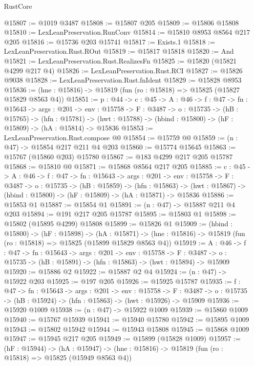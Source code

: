 \begin{lexlean}{RustCore}
\begin{coremodule}
@15807 := @1019 @3487
@15808 := @15807 @205
@15809 := @15806 @15808
@15810 := LexLeanPreservation.RunConv
@15814 := @15810 @8953 @8564 @217 @205
@15816 := @15736 @203 @15741
@15817 := Exists.{1}
@15818 := LexLeanPreservation.Rust.ROut
@15819 := @15817 @15818
@15820 := And
@15821 := LexLeanPreservation.Rust.RealizesFn
@15825 := @15820 (@15821 @4299 @217 @4)
@15826 := LexLeanPreservation.Rust.RCI
@15827 := @15826 @9038
@15828 := LexLeanPreservation.Rust.fnIdent
@15829 := @15828 @8953
@15836 := (hne : @15816) -> @15819 (fun (ro : @15818) => @15825 (@15827 @15829 @8563 @4))
@15851 := {p : @44} ->
  {c : @45} ->
  {A : @46} ->
  {f : @47} ->
  {fn : @15643} ->
  {args : @201} ->
  {env : @15758} ->
  {F : @3487} ->
  {o : @15735} ->
  (hB : @15765) ->
  (hfn : @15781) -> (hwt : @15788) -> (hbind : @15800) -> (hF : @15809) -> (hA : @15814) -> @15836
@15853 := LexLeanPreservation.Rust.compose @0
@15854 := @15759 @0
@15859 := (n : @47) -> @15854 @217 @211 @4 @203
@15860 := @15774 @15645
@15863 := @15767 (@15860 @203) @15780
@15867 := @183 @4299 @217 @205 @15787
@15868 := @15810 @0
@15871 := @15868 @8564 @217 @205
@15885 := {c : @45} ->
  {A : @46} ->
  {f : @47} ->
  {fn : @15643} ->
  {args : @201} ->
  {env : @15758} ->
  {F : @3487} ->
  {o : @15735} ->
  (hB : @15859) ->
  (hfn : @15863) -> (hwt : @15867) -> (hbind : @15800) -> (hF : @15809) -> (hA : @15871) -> @15836
@15886 := @15853 @1
@15887 := @15854 @1
@15891 := (n : @47) -> @15887 @211 @4 @203
@15894 := @191 @217 @205 @15787
@15895 := @15803 @1
@15898 := @15802 (@15895 @4299) @15808
@15899 := @15826 @1
@15909 := (hbind : @15800) ->
  (hF : @15898) ->
  (hA : @15871) -> (hne : @15816) -> @15819 (fun (ro : @15818) => @15825 (@15899 @15829 @8563 @4))
@15919 := {A : @46} ->
  {f : @47} ->
  {fn : @15643} ->
  {args : @201} ->
  {env : @15758} ->
  {F : @3487} -> {o : @15735} -> (hB : @15891) -> (hfn : @15863) -> (hwt : @15894) -> @15909
@15920 := @15886 @2
@15922 := @15887 @2 @4
@15924 := (n : @47) -> @15922 @203
@15925 := @197 @205
@15926 := @15925 @15787
@15935 := {f : @47} ->
  {fn : @15643} ->
  {args : @201} ->
  {env : @15758} ->
  {F : @3487} -> {o : @15735} -> (hB : @15924) -> (hfn : @15863) -> (hwt : @15926) -> @15909
@15936 := @15920 @1009
@15938 := (n : @47) -> @15922 @1009
@15939 := @15860 @1009
@15940 := @15767 @15939
@15941 := @15940 @15780
@15942 := @15895 @1009
@15943 := @15802 @15942
@15944 := @15943 @15808
@15945 := @15868 @1009
@15947 := @15945 @217 @205
@15949 := @15899 (@15828 @1009)
@15957 := (hF : @15944) ->
  (hA : @15947) -> (hne : @15816) -> @15819 (fun (ro : @15818) => @15825 (@15949 @8563 @4))

\end{coremodule}
\end{lexlean}
